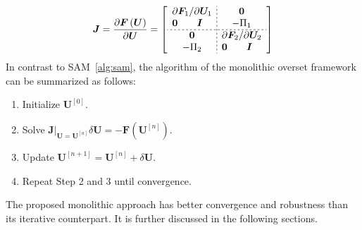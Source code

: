 \documentclass[preprint,12pt,sort&compress]{elsarticle}
\theoremstyle{definition}%
\begin{document}
\begin{align}
  \bm{J}
  =\frac{\partial \bm{F}\left(\bm{U}\right)}{\partial \bm{U}}
  =\left[
    \begin{array}{c;{2pt/2pt}c}
      \begin{matrix}
        \multicolumn{2}{c}{{\partial \bm{F}_1}/{\partial \bm{U}_{1}}} \\
        \bm{0} & \bm{I}
      \end{matrix}
      &
      \begin{matrix}
        \bm{0}\\
        -\Pi_1
      \end{matrix}
      \\ \hdashline[2pt/2pt]
      \begin{matrix}
        \bm{0} \\ 
        -\Pi_2
      \end{matrix}
      &
      \begin{matrix}
        \multicolumn{2}{c}{{\partial \bm{F}_2}/{\partial \bm{U}_{2}}} \\
        \bm{0} & \bm{I}
      \end{matrix}
    \end{array}
  \right]
\end{align}
In contrast to SAM~\ref{alg:sam}, the algorithm of the monolithic overset 
framework can be summarized as follows:
\begin{enumerate}
  \item Initialize $\bm{U}^{[0]}$.
  \item Solve $\bm{J}|_{\bm{U}=\bm{U}^{[n]}}\delta\bm{U} = -\bm{F}(\bm{U}^{[n]})$.
  \item Update $\bm{U}^{[n+1]} = \bm{U}^{[n]} + \delta\bm{U}$.
  \item Repeat Step 2 and 3 until convergence.
\end{enumerate}
The proposed monolithic approach has better convergence and robustness
than its iterative counterpart. It is further discussed in the following sections.
\end{document}
